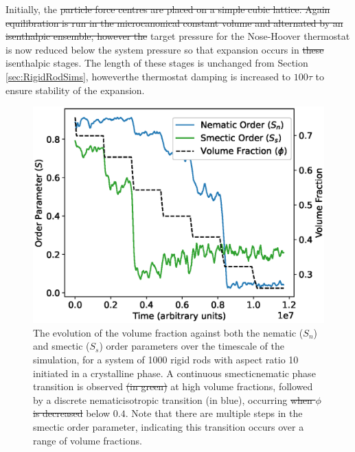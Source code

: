 \documentclass[11pt, a4paper]{article} %
\providecommand{\DIFadd}[1]{{\protect\color{blue}\uwave{#1}}} %
\providecommand{\DIFdel}[1]{{\protect\color{red}\sout{#1}}}                      %
\providecommand{\DIFaddbegin}{} %
\providecommand{\DIFaddend}{} %
\providecommand{\DIFdelbegin}{} %
\providecommand{\DIFdelend}{} %
\providecommand{\DIFaddFL}[1]{\DIFadd{#1}} %
\providecommand{\DIFdelFL}[1]{\DIFdel{#1}} %
\providecommand{\DIFaddbeginFL}{} %
\providecommand{\DIFaddendFL}{} %
\providecommand{\DIFdelbeginFL}{} %
\providecommand{\DIFdelendFL}{} %
\begin{document}
Initially, the \DIFdelbegin \DIFdel{particle force centres are placed on a simple cubic lattice. Again equilibration is run in the microcanonical constant volume and alternated by an isenthalpic ensemble, however the }\DIFdelend \DIFaddbegin \DIFadd{particle-force centres are \textcolor{forestgreen}{placed on a simple cubic lattice. Again equilibration is run in the microcanonical constant volume and alternated by an isenthalpic ensemble, however,} the }\DIFaddend target pressure for the Nose-Hoover thermostat is now reduced below the system pressure so that expansion occurs in \DIFdelbegin \DIFdel{these }\DIFdelend isenthalpic stages. The length of these stages is unchanged from Section \ref{sec:RigidRodSims}, however\DIFaddbegin \DIFadd{, }\DIFaddend the thermostat damping is increased to $100\tau$ to ensure stability of the expansion.

\begin{figure} [h!]
	\centering
	\includegraphics[width=0.7\linewidth]{Figures/rigidrod_cryorderparam}
	\caption{The evolution of the volume fraction against both the nematic ($S_{n}$) and smectic ($S_{s}$) order parameters over the timescale of the simulation, for a system of 1000 rigid rods with aspect ratio 10 initiated in a crystalline phase. A continuous smectic\textendash nematic phase transition is observed \DIFdelbeginFL \DIFdelFL{(in green) }\DIFdelendFL at high volume fractions, followed by a discrete nematic\textendash isotropic transition (in blue), occurring \DIFdelbeginFL \DIFdelFL{when $\phi$ is decreased }\DIFdelendFL \DIFaddbeginFL \DIFaddFL{\textcolor{forestgreen}{when $\phi$ decreased} }\DIFaddendFL below $0.4$. Note that there are multiple steps in the smectic order parameter, indicating this transition occurs over a range of volume fractions.}
	\label{fig:rr_crystalorder}
\end{figure} %
\end{document}

